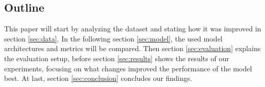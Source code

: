 \subsection*{Outline} \label{subsec:outline}
This paper will start by analyzing the dataset and stating how it was improved in section \ref{sec:data}.
In the following section \ref{sec:model}, the used model architectures and metrics will be compared.
Then section \ref{sec:evaluation} explains the evaluation setup, before section \ref{sec:results} shows the results of our experiments, focusing on what changes improved the performance of the model best.
At last, section \ref{sec:conclusion} concludes our findings.
